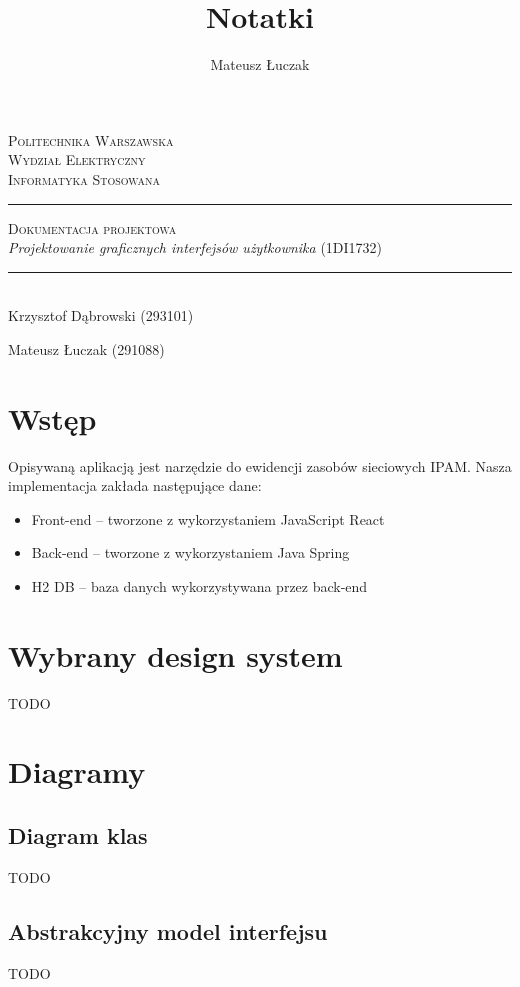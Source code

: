 \documentclass[a4paper,11pt]{article}
\title{Notatki}
\author{Mateusz Łuczak}
\date{}
\begin{document}
\thispagestyle{empty}
\begin{center}
	\textsc{\LARGE Politechnika Warszawska}\\[1.5cm]

	\textsc{\Large Wydział Elektryczny}\\[0.5cm]

	\textsc{\large Informatyka Stosowana}\\[2cm]

	\rule{\linewidth}{0.5mm}

	\textsc{\Large Dokumentacja projektowa}\\[0.5cm]

	\textit{Projektowanie graficznych interfejsów użytkownika} (1DI1732)

	\rule{\linewidth}{0.5mm}\\[3cm]

	\normalsize
	Krzysztof Dąbrowski (293101)

	Mateusz Łuczak (291088)
\end{center}

\newpage
\tableofcontents
{}
\newpage

\section{Wstęp}
Opisywaną aplikacją jest narzędzie do ewidencji zasobów sieciowych IPAM. Nasza implementacja zakłada następujące dane:
\begin{itemize}
	\item Front-end -- tworzone z wykorzystaniem JavaScript React
	\item Back-end -- tworzone z wykorzystaniem Java Spring
	\item H2 DB -- baza danych wykorzystywana przez back-end
\end{itemize}

\section{Wybrany design system}
TODO

\section{Diagramy}
\subsection{Diagram klas}
TODO

\subsection{Abstrakcyjny model interfejsu}
TODO
\end{document}
